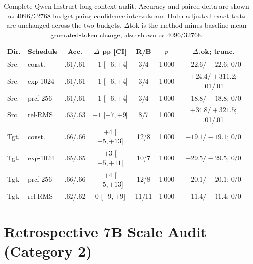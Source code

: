 \begin{table}[H]
\centering
\scriptsize
\setlength{\tabcolsep}{0.6pt}
\caption{Complete Qwen-Instruct long-context audit.  Accuracy and paired delta
are shown as $4096/32768$-budget pairs; confidence intervals and Holm-adjusted
exact tests are unchanged across the two budgets.  $\Delta$tok is the method
minus baseline mean generated-token change, also shown as $4096/32768$.}
\label{tab:long-context}
\fontsize{6.5}{7.2}\selectfont
\begin{tabular}{@{}llccccc@{}}
\toprule
Dir. & Schedule & Acc. & $\Delta$ pp [CI] & R/B & $p$ & $\Delta$tok; trunc. \\
\midrule
Src. & const. & .61/.61 & $-1$ [$-6,+4$] & 3/4 & 1.000 & $-22.6/-22.6$; 0/0 \\
Src. & exp-1024 & .61/.61 & $-1$ [$-6,+4$] & 3/4 & 1.000 & $+24.4/+311.2$; .01/.01 \\
Src. & pref-256 & .61/.61 & $-1$ [$-6,+4$] & 3/4 & 1.000 & $-18.8/-18.8$; 0/0 \\
Src. & rel-RMS & .63/.63 & $+1$ [$-7,+9$] & 8/7 & 1.000 & $+34.8/+321.5$; .01/.01 \\
Tgt. & const. & .66/.66 & $+4$ [$-5,+13$] & 12/8 & 1.000 & $-19.1/-19.1$; 0/0 \\
Tgt. & exp-1024 & .65/.65 & $+3$ [$-5,+11$] & 10/7 & 1.000 & $-29.5/-29.5$; 0/0 \\
Tgt. & pref-256 & .66/.66 & $+4$ [$-5,+13$] & 12/8 & 1.000 & $-20.1/-20.1$; 0/0 \\
Tgt. & rel-RMS & .62/.62 & $0$ [$-9,+9$] & 11/11 & 1.000 & $-11.4/-11.4$; 0/0 \\
\bottomrule
\end{tabular}
\end{table}

\newpage
\section{Retrospective 7B Scale Audit (Category 2)}
\label{app:scale-7b}

